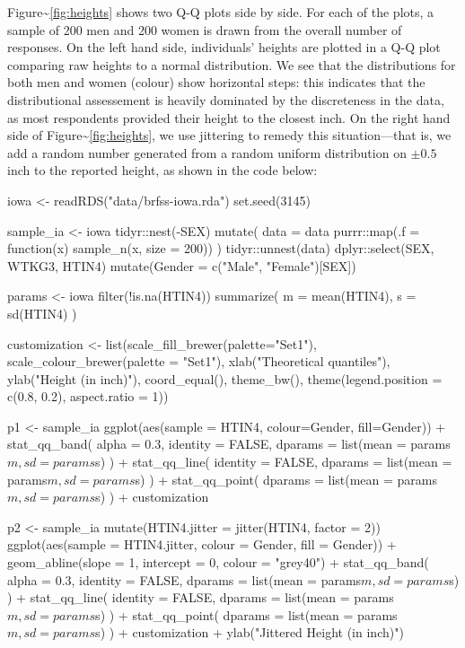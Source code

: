 Figure\textasciitilde{}\ref{fig:heights} shows two Q-Q plots side by
side. For each of the plots, a sample of 200 men and 200 women is drawn
from the overall number of responses. On the left hand side,
individuals' heights are plotted in a Q-Q plot comparing raw heights to
a normal distribution. We see that the distributions for both men and
women (colour) show horizontal steps: this indicates that the
distributional assessement is heavily dominated by the discreteness in
the data, as most respondents provided their height to the closest inch.
On the right hand side of Figure\textasciitilde{}\ref{fig:heights}, we
use jittering to remedy this situation---that is, we add a random number
generated from a random uniform distribution on \(\pm 0.5\) inch to the
reported height, as shown in the code below:

\begin{Schunk}
\begin{Sinput}
iowa <- readRDS("data/brfss-iowa.rda")
set.seed(3145)

sample_ia <- iowa %>% 
  tidyr::nest(-SEX) %>% 
  mutate(
    data = data %>% 
    purrr::map(.f = function(x) sample_n(x, size = 200))
    ) %>% 
  tidyr::unnest(data) %>% 
  dplyr::select(SEX, WTKG3, HTIN4) %>%
  mutate(Gender = c("Male", "Female")[SEX])

params <- iowa %>% 
  filter(!is.na(HTIN4)) %>% 
  summarize(
    m = mean(HTIN4),
    s = sd(HTIN4)
  )

customization <- list(scale_fill_brewer(palette="Set1"),
  scale_colour_brewer(palette = "Set1"),
  xlab("Theoretical quantiles"),
  ylab("Height (in inch)"),
  coord_equal(),
  theme_bw(),
  theme(legend.position = c(0.8, 0.2), aspect.ratio = 1))

p1 <- sample_ia %>% 
  ggplot(aes(sample = HTIN4, colour=Gender, fill=Gender)) + 
  stat_qq_band(
    alpha = 0.3, 
    identity = FALSE,
    dparams = list(mean = params$m, sd = params$s)
  ) + 
  stat_qq_line( 
    identity = FALSE,
    dparams = list(mean = params$m, sd = params$s)
  ) + 
  stat_qq_point( 
    dparams = list(mean = params$m, sd = params$s)
  ) +
  customization

p2 <- sample_ia %>% 
  mutate(HTIN4.jitter = jitter(HTIN4, factor = 2)) %>% 
  ggplot(aes(sample = HTIN4.jitter, colour = Gender, fill = Gender)) + 
  geom_abline(slope = 1, intercept = 0, colour = "grey40") +
  stat_qq_band(
    alpha = 0.3, 
    identity = FALSE,
    dparams = list(mean = params$m, sd = params$s)
  ) +
  stat_qq_line(
    identity = FALSE,
    dparams = list(mean = params$m, sd = params$s)
  ) + 
  stat_qq_point(
    dparams = list(mean = params$m, sd = params$s)
  ) +
  customization +
  ylab("Jittered Height (in inch)") 
\end{Sinput}
\end{Schunk}

